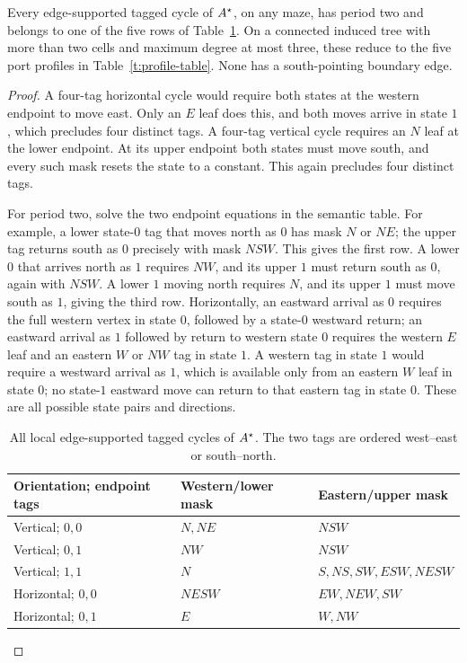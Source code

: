 \begin{lemma}\label{t:edge-profiles}
Every edge-supported tagged cycle of \(A^{\star}\), on any maze, has period
two and belongs to one of the five rows of Table~\ref{t:edge-table}.
On a connected induced tree with more than two cells and maximum degree
at most three, these reduce to the five port profiles in
Table~\ref{t:profile-table}. None has a south-pointing boundary edge.
\end{lemma}
\begin{proof}
A four-tag horizontal cycle would require both states at the western
endpoint to move east. Only an \(E\) leaf does this, and both moves arrive
in state \(1\), which precludes four distinct tags. A four-tag vertical
cycle requires an \(N\) leaf at the lower endpoint. At its upper endpoint
both states must move south, and every such mask resets the state to a
constant. This again precludes four distinct tags.

For period two, solve the two endpoint equations in the semantic table.
For example, a lower state-\(0\) tag that moves north as \(0\) has mask
\(N\) or \(NE\); the upper tag returns south as \(0\) precisely with mask
\(NSW\). This gives the first row. A lower \(0\) that arrives north as
\(1\) requires \(NW\), and its upper \(1\) must return south as \(0\),
again with \(NSW\). A lower \(1\) moving north requires \(N\), and its
upper \(1\) must move south as \(1\), giving the third row. Horizontally,
an eastward arrival as \(0\) requires the full western vertex in state
\(0\), followed by a state-\(0\) westward return; an eastward arrival as
\(1\) followed by return to western state \(0\) requires the western
\(E\) leaf and an eastern \(W\) or \(NW\) tag in state \(1\).
A western tag in state \(1\) would require a westward arrival as \(1\),
which is available only from an eastern \(W\) leaf in state \(0\);
no state-\(1\) eastward move can return to that eastern tag in state \(0\).
These are all possible state pairs and directions.

\begin{table}[!htbp]
\centering
\small
\begin{tabular}{@{}lll@{}}
\toprule
Orientation; endpoint tags & Western/lower mask & Eastern/upper mask\\
\midrule
Vertical; \(0,0\) & \(N,NE\) & \(NSW\)\\
Vertical; \(0,1\) & \(NW\) & \(NSW\)\\
Vertical; \(1,1\) & \(N\) & \(S,NS,SW,ESW,NESW\)\\
Horizontal; \(0,0\) & \(NESW\) & \(EW,NEW,SW\)\\
Horizontal; \(0,1\) & \(E\) & \(W,NW\)\\
\bottomrule
\end{tabular}
\caption{All local edge-supported tagged cycles of \(A^{\star}\). The two
tags are ordered west--east or south--north.}\label{t:edge-table}
\end{table}


\end{proof}
